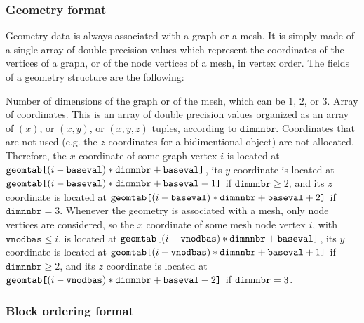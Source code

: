 \subsubsection{Geometry format}
\label{sec-lib-format-geom}

Geometry data is always associated with a graph or a mesh. It is
simply made of a single array of double-precision values which
represent the coordinates of the vertices of a graph, or of
the node vertices of a mesh, in vertex order. The fields of
a geometry structure are the following:
\begin{itemize}
\iteme[{\tt dimnnbr}]
Number of dimensions of the graph or of the mesh, which can be $1$,
$2$, or $3$.
\iteme[{\tt geomtab}]
Array of coordinates. This is an array of double precision values
organized as an array of $(x)$, or $(x,y)$, or $(x,y,z)$ tuples,
according to $\mathtt{dimnnbr}$. Coordinates that are not used
(e.g. the $z$ coordinates for a bidimentional object) are not
allocated. Therefore, the $x$ coordinate of some graph vertex $i$ is
located at $\mathtt{geomtab}\mbox{\tt [}(i - \mathtt{baseval}) *
\mathtt{dimnnbr}  + \mathtt{baseval}\mbox{\tt ]}$, its $y$ coordinate
is located at $\mathtt{geomtab}\mbox{\tt [}(i - \mathtt{baseval}) *
  \mathtt{dimnnbr} + \mathtt{baseval} + 1\mbox{\tt ]}$ if
$\mathtt{dimnnbr} \geq 2$, and its $z$ coordinate is located at
$\mathtt{geomtab}\mbox{\tt [}(i - \mathtt{baseval}) * \mathtt{dimnnbr}
+ \mathtt{baseval} + 2\mbox{\tt ]}$ if $\mathtt{dimnnbr} =
3$. Whenever the geometry is associated with a mesh,
only node vertices are considered, so the $x$ coordinate of some mesh
node vertex $i$, with $\mathtt{vnodbas} \leq i$, is located
at $\mathtt{geomtab}\mbox{\tt [}(i - \mathtt{vnodbas}) *
\mathtt{dimnnbr} + \mathtt{baseval}\mbox{\tt ]}$, its $y$ coordinate
is located at $\mathtt{geomtab}\mbox{\tt [}(i - \mathtt{vnodbas}) *
\mathtt{dimnnbr} + \mathtt{baseval} + 1\mbox{\tt ]}$ if
$\mathtt{dimnnbr} \geq 2$, and its $z$ coordinate is located at
$\mathtt{geomtab}\mbox{\tt [}(i - \mathtt{vnodbas}) * \mathtt{dimnnbr}
+ \mathtt{baseval} + 2\mbox{\tt ]}$ if $\mbox{\tt dimnnbr} = 3$.
\end{itemize}

\subsubsection{Block ordering format}
\label{sec-lib-format-order}

